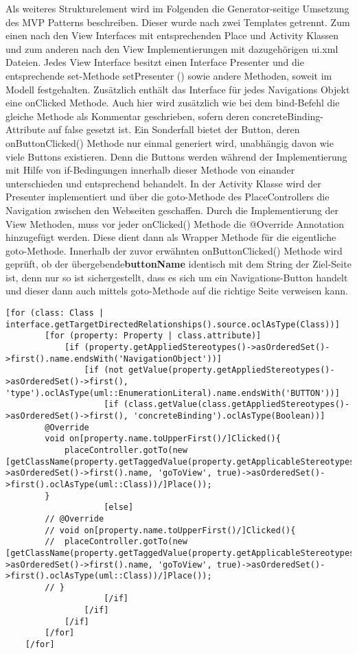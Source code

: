 Als weiteres Strukturelement wird im Folgenden die Generator-seitige Umsetzung des MVP Patterns beschreiben. Dieser wurde nach zwei Templates getrennt. Zum einen nach den View Interfaces mit entsprechenden Place und Activity Klassen und zum anderen nach den View Implementierungen mit dazugehörigen ui.xml Dateien.
Jedes View Interface besitzt einen Interface Presenter und die entsprechende set-Methode setPresenter () sowie andere Methoden, soweit im Modell festgehalten. Zusätzlich enthält das Interface für jedes Navigations Objekt eine onClicked Methode. Auch hier wird zusätzlich wie bei dem bind-Befehl die gleiche Methode als Kommentar geschrieben, sofern deren concreteBinding-Attribute auf false gesetzt ist. Ein Sonderfall bietet der Button, deren onButtonClicked() Methode nur einmal generiert wird, unabhängig davon wie viele Buttons existieren. Denn die Buttons werden während der Implementierung mit Hilfe von if-Bedingungen innerhalb dieser Methode von einander unterschieden und entsprechend behandelt. 
In der Activity Klasse wird der Presenter implementiert und über die goto-Methode des PlaceControllers die Navigation zwischen den Webseiten geschaffen. Durch die Implementierung der View Methoden, muss vor jeder onClicked() Methode die @Override Annotation hinzugefügt werden. Diese dient dann als Wrapper Methode für die eigentliche goto-Methode. Innerhalb der zuvor erwähnten onButtonClicked() Methode wird geprüft, ob der übergebende\textbf{buttonName} identisch mit dem String der Ziel-Seite ist, denn nur so ist sichergestellt, dass es sich um ein Navigations-Button handelt und dieser dann auch mittels goto-Methode auf die richtige Seite verweisen kann.
\lstset{language=OCL}
\begin{lstlisting}[caption={Auszug der Generieung der on''Clicked() Methode}]
[for (class: Class | interface.getTargetDirectedRelationships().source.oclAsType(Class))]
		[for (property: Property | class.attribute)]
			[if (property.getAppliedStereotypes()->asOrderedSet()->first().name.endsWith('NavigationObject'))]
				[if (not getValue(property.getAppliedStereotypes()->asOrderedSet()->first(), 'type').oclAsType(uml::EnumerationLiteral).name.endsWith('BUTTON'))]
					[if (class.getValue(class.getAppliedStereotypes()->asOrderedSet()->first(), 'concreteBinding').oclAsType(Boolean))]						
		@Override
		void on[property.name.toUpperFirst()/]Clicked(){
			placeController.gotTo(new [getClassName(property.getTaggedValue(property.getApplicableStereotypes()->asOrderedSet()->first().name, 'goToView', true)->asOrderedSet()->first().oclAsType(uml::Class))/]Place());
		}
					[else]
		// @Override
		// void on[property.name.toUpperFirst()/]Clicked(){
		//	placeController.gotTo(new [getClassName(property.getTaggedValue(property.getApplicableStereotypes()->asOrderedSet()->first().name, 'goToView', true)->asOrderedSet()->first().oclAsType(uml::Class))/]Place());
		// }
					[/if]
				[/if]
			[/if]
		[/for]
	[/for]
\end{lstlisting}


